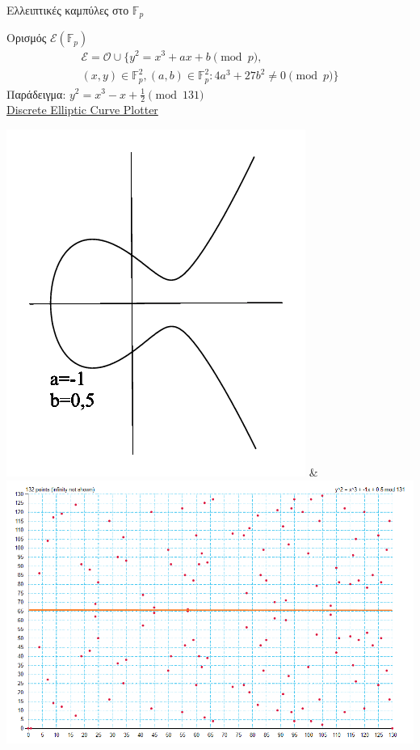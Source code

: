 \documentclass[handout]{beamer}
\begin{document}
\begin{frame}{Ελλειπτικές καμπύλες στο $\mathbb{F}_p$}

Ορισμός $\mathcal{E}(\mathbb{F}_p)$
\begin{align*}
 \mathcal E = \mathcal O \cup \{  y^2 = x^3 + ax +b \pmod{p},  \\
 (x,y) \in \mathbb{F}_p^2, (a,b) \in \mathbb{F}_p^2:  4a^3+27b^2 \neq 0 \pmod{p} \} 
\end{align*}
\pause
\medskip
Παράδειγμα: $y^2 = x^3-x+\frac{1}{2} \pmod{131}$\\
 \href{http://www.graui.de/elliptic-plot.htm}{Discrete Elliptic Curve Plotter}\\
\begin{center}
\includegraphics[scale=0.25]{qaz3.png} &
\includegraphics[scale=0.25]{ec997}
\end{center}

\end{frame}
\end{document}
